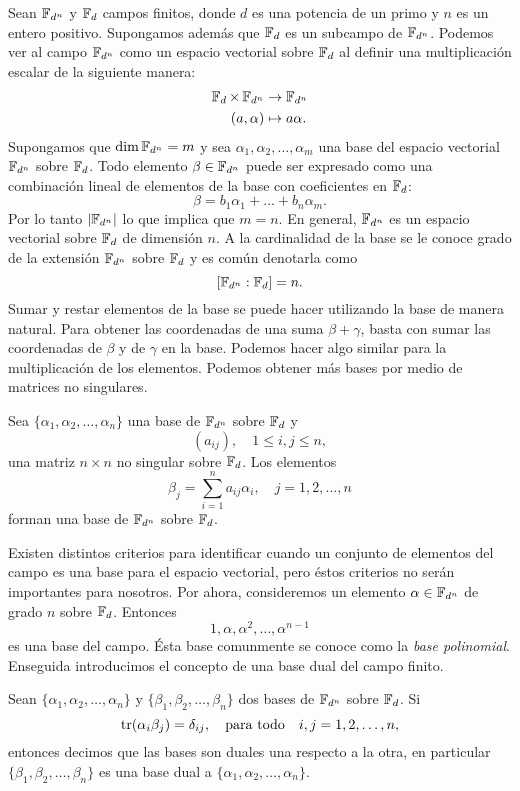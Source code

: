 Sean $\operatorname{\mathbb{F}}_{d^{n}}$ y $\operatorname{\mathbb{F}}_d$ campos finitos, donde $d$ es una
potencia de un primo y $n$ es un entero positivo. Supongamos
además que $\operatorname{\mathbb{F}}_d$ es un subcampo de $\operatorname{\mathbb{F}}_{d^{n}}$. Podemos
ver al campo $\operatorname{\mathbb{F}}_{d^{n}}$ como un espacio vectorial sobre
$\operatorname{\mathbb{F}}_d$ al definir una multiplicación escalar de la siguiente
manera:
\begin{align*}
  \operatorname{\mathbb{F}}_d \times \operatorname{\mathbb{F}}_{d^{n}} &\to \operatorname{\mathbb{F}}_{d^{n}} \\
  (a, \alpha) &\mapsto a\alpha.
\end{align*}
Supongamos que $\dim \operatorname{\mathbb{F}}_{d^{n}} = m$ y sea $\alpha_1,
\alpha_2, \ldots, \alpha_m$ una base del espacio vectorial
$\operatorname{\mathbb{F}}_{d^{n}}$ sobre $\operatorname{\mathbb{F}}_d$. Todo elemento $\beta \in
\operatorname{\mathbb{F}}_{d^{n}}$ puede ser expresado como una combinación lineal
de elementos de la base con coeficientes en $\operatorname{\mathbb{F}}_d$:
\[
  \beta = b_1 \alpha_1 + \ldots + b_n \alpha_m.
\] 
Por lo tanto $\left|\operatorname{\mathbb{F}}_{d^{n}}\right|$ lo que implica que $m
= n$. En general, $\operatorname{\mathbb{F}}_{d^{n}}$ es un espacio vectorial sobre
$\operatorname{\mathbb{F}}_d$ de dimensión $n$. A la cardinalidad de la base se le
conoce grado de la extensión $\operatorname{\mathbb{F}}_{d^{n}}$ sobre $\operatorname{\mathbb{F}}_d$ y es
común denotarla como
\[
  [\operatorname{\mathbb{F}}_{d^{n}} : \operatorname{\mathbb{F}}_d] = n.
\] 
Sumar y restar elementos de la base se puede hacer
utilizando la base de manera natural. Para obtener las
coordenadas de una suma $\beta + \gamma$, basta con sumar
las coordenadas de $\beta$ y de $\gamma$ en la base. Podemos
hacer algo similar para la multiplicación de los elementos.
Podemos obtener más bases por medio de matrices no
singulares.
\begin{theorem}
  Sea $\{\alpha_1,\alpha_2,\ldots,\alpha_n\}$ una base de
  $\operatorname{\mathbb{F}}_{d^{n}}$ sobre $\operatorname{\mathbb{F}}_d$ y 
  \[
    (a_{ij}), 
    \quad 1 \leq i,j \leq n,
  \] 
  una matriz $n \times n$ no singular sobre $\operatorname{\mathbb{F}}_d$. Los
  elementos
  \[
    \beta_j
    = \sum_{i=1}^{n} a_{ij} \alpha_i,
    \quad j = 1,2,\ldots,n
  \] 
  forman una base de $\operatorname{\mathbb{F}}_{d^{n}}$ sobre $\operatorname{\mathbb{F}}_d$.
\end{theorem}
Existen distintos criterios para identificar cuando un
conjunto de elementos del campo es una base para el espacio
vectorial, pero éstos criterios no serán importantes para
nosotros. Por ahora, consideremos un elemento $\alpha \in
\operatorname{\mathbb{F}}_{d^{n}}$ de grado $n$ sobre $\operatorname{\mathbb{F}}_d$. Entonces
\[
  1, \alpha, \alpha^2, \ldots, \alpha^{n-1}
\] 
es una base del campo. Ésta base comunmente se conoce como
la \textit{base polinomial}. Enseguida introducimos el
concepto de una base dual del campo finito.
\begin{definition}
  Sean $\{\alpha_1,\alpha_2,\ldots,\alpha_n\}$ y
  $\{\beta_1,\beta_2,\ldots,\beta_n\}$ dos bases de
  $\operatorname{\mathbb{F}}_{d^{n}}$ sobre $\operatorname{\mathbb{F}}_d$. Si
  \[
    \operatorname{tr}(\alpha_i \beta_j)
    = \delta_{ij},
    \quad
    \text{para todo}
    \quad
    i,j = 1,2,\ldots,n,
  \] 
  entonces decimos que las bases son duales una respecto a
  la otra, en particular
  $\{\beta_1,\beta_2,\ldots,\beta_n\}$ es una base dual a
  $\{\alpha_1,\alpha_2,\ldots,\alpha_n\}$.
\end{definition}
